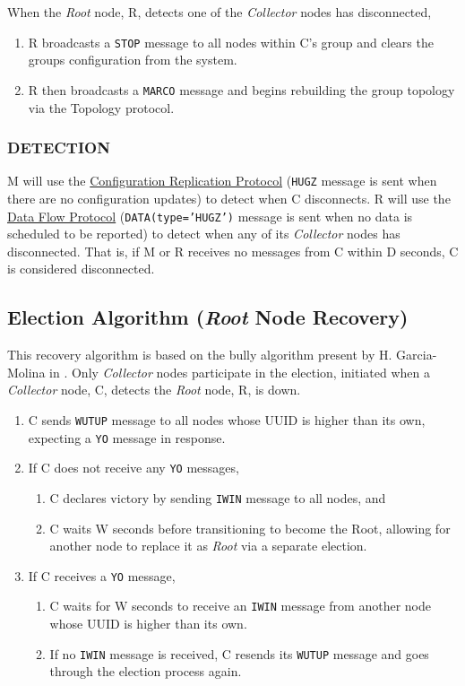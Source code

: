 When the \textit{Root} node, R, detects one of the \textit{Collector} nodes has disconnected,

\begin{enumerate}
\item R broadcasts a \texttt{STOP} message to all nodes within C's group and clears the groups configuration from the
      \dcamp system.
\item R then broadcasts a \texttt{MARCO} message and begins rebuilding the group topology via the Topology protocol.
\end{enumerate}

\subsubsection{DETECTION}

M will use the \hyperref[proto_config]{Configuration Replication Protocol} (\texttt{HUGZ} message is sent when there are
no configuration updates) to detect when C disconnects. R will use the \hyperref[proto_data]{Data Flow Protocol}
(\texttt{DATA(type='HUGZ')} message is sent when no data is scheduled to be reported) to detect when any of its
\textit{Collector} nodes has disconnected. That is, if M or R receives no messages from C within D seconds, C is
considered disconnected.

\subsection{Election Algorithm (\textit{Root} Node Recovery)}
\label{algor_elect}

This recovery algorithm is based on the bully algorithm present by H. Garcia-Molina in \cite{bully}. Only
\textit{Collector} nodes participate in the election, initiated when a \textit{Collector} node, C, detects the
\textit{Root} node, R, is down.

\begin{enumerate}
\item C sends \texttt{WUTUP} message to all nodes whose UUID is higher than its own, expecting a \texttt{YO} message in
      response.
\item If C does not receive any \texttt{YO} messages,
      \begin{enumerate}
      \item C declares victory by sending \texttt{IWIN} message to all nodes, and
      \item C waits W seconds before transitioning to become the Root, allowing for another node to replace it as
            \textit{Root} via a separate election.
      \end{enumerate}
\item If C receives a \texttt{YO} message,
      \begin{enumerate}
      \item C waits for W seconds to receive an \texttt{IWIN} message from another node whose UUID is higher than its
            own.
      \item If no \texttt{IWIN} message is received, C resends its \texttt{WUTUP} message and goes through the election
            process again.
      \end{enumerate}
\end{enumerate}


